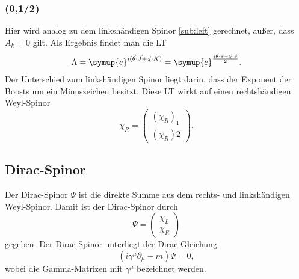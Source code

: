 \documentclass[
  captions=tableheading,  %
  titlepage=firstiscover, %
]{scrartcl}
\begin{document}
\subsubsection{(0,1/2)}
Hier wird analog zu dem linkshändigen Spinor \ref{sub:left} gerechnet, außer, dass $A_k = 0$ gilt. 
Als Ergebnis findet man die LT 
\begin{equation*}
  \Lambda  = \symup{e}^{i ( \vec{\theta} \cdot \vec{J} + \vec{\chi} \cdot \vec{K})} 
  = \symup{e}^{\frac{i\vec{\theta} \cdot \vec{\sigma} - \vec{\chi} \cdot \vec{\sigma}}{2}}.
\end{equation*}
Der Unterschied zum linkshändigen Spinor liegt darin, dass der Exponent der Boosts um ein Minuszeichen besitzt.
Diese LT wirkt auf einen rechtshändigen Weyl-Spinor  
\begin{equation*}
  \chi_R = 
  \begin{pmatrix}
  (\chi_R)_1 \\ (\chi_R)2  
  \end{pmatrix}.
\end{equation*}
\subsection{Dirac-Spinor}
Der Dirac-Spinor $\Psi$ ist die direkte Summe aus dem rechts- und linkshändigen Weyl-Spinor.
Damit ist der Dirac-Spinor durch 
\begin{equation*}
  \Psi = 
  \begin{pmatrix}
    \chi_L \\
    \chi_R
  \end{pmatrix}
\end{equation*}
gegeben.
Der Dirac-Spinor unterliegt der Dirac-Gleichung 
\begin{equation*}
  (i\gamma^{\mu}\partial_{\mu} - m)\Psi = 0,
\end{equation*}
wobei die Gamma-Matrizen mit $\gamma^{\mu}$ bezeichnet werden.
\end{document}
